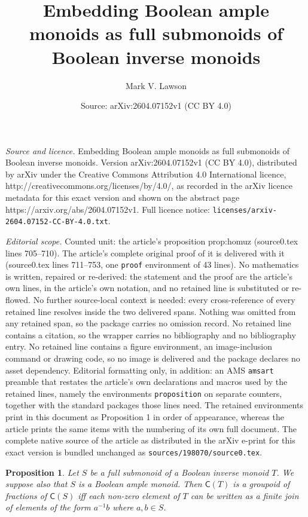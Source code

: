 \documentclass[10pt,a4paper]{amsart}
\title{Embedding Boolean ample monoids as full submonoids of Boolean inverse monoids}
\author{Mark V. Lawson}
\date{Source: arXiv:2604.07152v1 (CC BY 4.0)}
\newtheorem{proposition}{Proposition}
\begin{document}
\maketitle

\noindent\emph{Source and licence.} Embedding Boolean ample monoids as full submonoids of Boolean inverse monoids. Version arXiv:2604.07152v1 (CC BY 4.0), distributed by arXiv under the Creative Commons Attribution 4.0 International licence, http://creativecommons.org/licenses/by/4.0/, as recorded in the arXiv licence metadata for this exact version and shown on the abstract page https://arxiv.org/abs/2604.07152v1. Full licence notice: \texttt{licenses/arxiv-2604.07152-CC-BY-4.0.txt}.\par\smallskip

\noindent\textit{Editorial scope.} Counted unit: the article's proposition prop:homuz (source0.tex lines 705--710). The article's complete original proof of it is delivered with it (source0.tex lines 711--753, one \texttt{proof} environment of 43 lines). No mathematics is written, repaired or re-derived: the statement and the proof are the article's own lines, in the article's own notation, and no retained line is substituted or re-flowed.  No further source-local context is needed: every cross-reference of every retained line resolves inside the two delivered spans.  Nothing was omitted from any retained span, so the package carries no omission record.  No retained line contains a citation, so the wrapper carries no bibliography and no bibliography entry.  No retained line contains a figure environment, an image-inclusion command or drawing code, so no image is delivered and the package declares no asset dependency.  Editorial formatting only, in addition: an AMS \texttt{amsart} preamble that restates the article's own declarations and macros used by the retained lines, namely the environments \texttt{proposition} on separate counters, together with the standard packages those lines need.  The retained environments print in this document as Proposition 1 in order of appearance, whereas the article prints the same items with the numbering of its own full document.  The complete native source of the article as distributed in the arXiv e-print for this exact version is bundled unchanged as \texttt{sources/198070/source0.tex}.
\begin{proposition}\label{prop:homuz} Let $S$ be a full submonoid of a Boolean inverse monoid $T$.
We suppose also that $S$ is a Boolean ample monoid.
Then $\mathsf{C}(T)$ is a groupoid of fractions of $\mathsf{C}(S)$ iff
each non-zero element of $T$ can be written as a finite join of elements of the form $a^{-1}b$
where $a,b \in S$.
\end{proposition}
\end{document}
